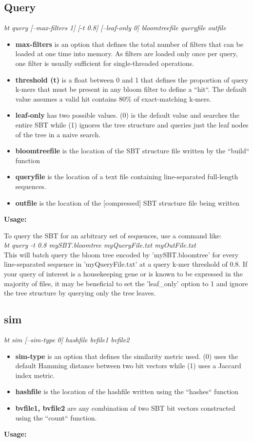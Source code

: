 \documentclass{article}
\begin{document}
\subsection{Query}
\textit{bt query [--max-filters 1] [-t 0.8] [--leaf-only 0] bloomtreefile queryfile outfile}
\begin{itemize}
\item \textbf{max-filters} is an option that defines the total number of filters that can be loaded at one time into memory. As filters are loaded only once per query, one filter is usually sufficient for single-threaded operations.
\item \textbf{threshold (t)} is a float between 0 and 1 that defines the proportion of query k-mers that must be present in any bloom filter to define a ``hit``. The default value assumes a valid hit contains 80\% of exact-matching k-mers.
\item \textbf{leaf-only} has two possible values. (0) is the default value and searches the entire SBT while (1) ignores the tree structure and queries just the leaf nodes of the tree in a naive search.
\item \textbf{bloomtreefile} is the location of the SBT structure file written by the ``build`` function
\item \textbf{queryfile} is the location of a text file containing line-separated full-length sequences.
\item \textbf{outfile} is the location of the [compressed] SBT structure file being written
\end{itemize}
\textbf{Usage:}

To query the SBT for an arbitrary set of sequences, use a command like: \\

\textit{bt query -t 0.8 mySBT.bloomtree myQueryFile.txt myOutFile.txt} \\

This will batch query the bloom tree encoded by 'mySBT.bloomtree' for every line-separated sequence in 'myQueryFile.txt' at a query k-mer threshold of 0.8. If your query of interest is a housekeeping gene or is known to be expressed in the majority of files, it may be beneficial to set the 'leaf\_only' option to 1 and ignore the tree structure by querying only the tree leaves. 

\subsection{sim}
\textit{bt sim [--sim-type 0] hashfile bvfile1 bvfile2}
\begin{itemize}
\item \textbf{sim-type} is an option that defines the similarity metric used. (0) uses the default Hamming distance between two bit vectors while (1) uses a Jaccard index metric.
\item \textbf{hashfile} is the location of the hashfile written using the ``hashes`` function
\item \textbf{bvfile1, bvfile2} are any combination of two SBT bit vectors constructed using the ``count`` function.
\end{itemize}
\textbf{Usage:}
\end{document}
